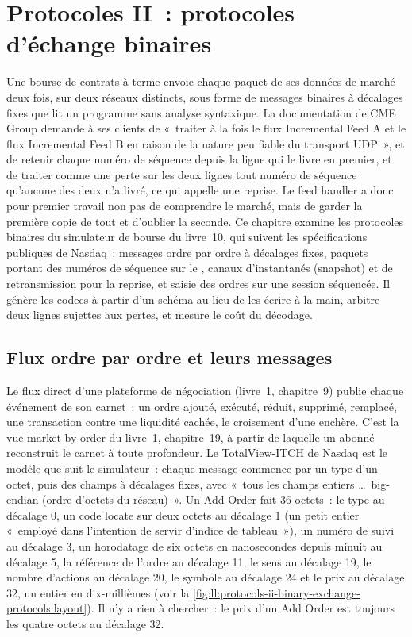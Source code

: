 \chapter{Protocoles II~: protocoles d'échange binaires}\label{ch:ll:protocols-ii-binary-exchange-protocols}

Une bourse de contrats à terme envoie chaque paquet de ses données de marché deux fois, sur deux réseaux distincts, sous forme de messages binaires à décalages fixes
que lit un programme sans analyse syntaxique. La documentation de CME Group demande à ses clients de «~traiter à la fois le flux Incremental
Feed A et le flux Incremental Feed B en raison de la nature peu fiable du transport UDP~», et de retenir chaque numéro de séquence
depuis la ligne qui le livre en premier, et de traiter comme une perte sur les deux lignes tout numéro de séquence qu'aucune des deux n'a livré, ce qui appelle
une reprise. Le feed handler a donc pour premier travail non pas de comprendre le marché, mais de garder la première copie de tout
et d'oublier la seconde. Ce chapitre examine les protocoles binaires du simulateur de bourse du livre~10, qui suivent
les spécifications publiques de Nasdaq~: messages ordre par ordre à décalages fixes, paquets portant des numéros de séquence sur le
, canaux d'instantanés (snapshot) et de retransmission pour la reprise, et saisie des ordres sur une session séquencée. Il génère les
codecs à partir d'un schéma au lieu de les écrire à la main, arbitre deux lignes sujettes aux pertes, et mesure le coût du décodage.

\section{Flux ordre par ordre et leurs messages}

Le flux direct d'une plateforme de négociation (livre~1, chapitre~9) publie chaque événement de son carnet~: un ordre ajouté, exécuté, réduit,
supprimé, remplacé, une transaction contre une liquidité cachée, le croisement d'une enchère. C'est la vue market-by-order du
livre~1, chapitre~19, à partir de laquelle un abonné reconstruit le carnet à toute profondeur. Le TotalView-ITCH de Nasdaq est le modèle que
suit le simulateur~: chaque message commence par un type d'un octet, puis des champs à décalages fixes, avec «~tous les champs entiers \dots\
big-endian (ordre d'octets du réseau)~». Un Add Order fait 36 octets~: le type au décalage 0, un code locate sur deux octets au décalage 1 (un petit entier
«~employé dans l'intention de servir d'indice de tableau~»), un numéro de suivi au décalage 3, un horodatage de six octets en
nanosecondes depuis minuit au décalage 5, la référence de l'ordre au décalage 11, le sens au décalage 19, le nombre d'actions au décalage 20, le symbole au décalage 24 et le prix
au décalage 32, un entier en dix-millièmes (voir la \cref{fig:ll:protocols-ii-binary-exchange-protocols:layout}). Il n'y a rien à chercher~: le prix
d'un Add Order est toujours les quatre octets au décalage 32.

